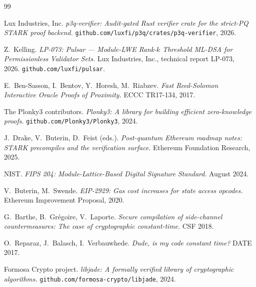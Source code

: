 \documentclass[11pt,a4paper]{article}
\begin{document}
\begin{thebibliography}{99}

 Lux Industries, Inc.
\emph{p3q-verifier: Audit-gated Rust verifier crate for the strict-PQ
STARK proof backend.} \texttt{github.com/luxfi/p3q/crates/p3q-verifier},
2026.

 Z.~Kelling.
\emph{LP-073: Pulsar --- Module-LWE Rank-$k$ Threshold ML-DSA for
Permissionless Validator Sets.} Lux Industries, Inc., technical report
LP-073, 2026. \texttt{github.com/luxfi/pulsar}.

 E.~Ben-Sasson, I.~Bentov, Y.~Horesh, M.~Riabzev.
\emph{Fast Reed-Solomon Interactive Oracle Proofs of Proximity.}
ECCC TR17-134, 2017.

 The Plonky3 contributors.
\emph{Plonky3: A library for building efficient zero-knowledge
proofs.} \texttt{github.com/Plonky3/Plonky3}, 2024.

J.~Drake, V.~Buterin, D.~Feist (eds.).
\emph{Post-quantum Ethereum roadmap notes: STARK precompiles and the
verification surface.} Ethereum Foundation Research, 2025.

 NIST.
\emph{FIPS 204: Module-Lattice-Based Digital Signature Standard.}
August 2024.

 V.~Buterin, M.~Swende.
\emph{EIP-2929: Gas cost increases for state access opcodes.}
Ethereum Improvement Proposal, 2020.

 G.~Barthe, B.~Gr\'egoire, V.~Laporte.
\emph{Secure compilation of side-channel countermeasures: The case of
cryptographic constant-time.}
CSF 2018.

 O.~Reparaz, J.~Balasch, I.~Verbauwhede.
\emph{Dude, is my code constant time?} DATE 2017.

 Formosa Crypto project.
\emph{libjade: A formally verified library of cryptographic
algorithms.} \texttt{github.com/formosa-crypto/libjade}, 2024.

\end{thebibliography}
\end{document}
